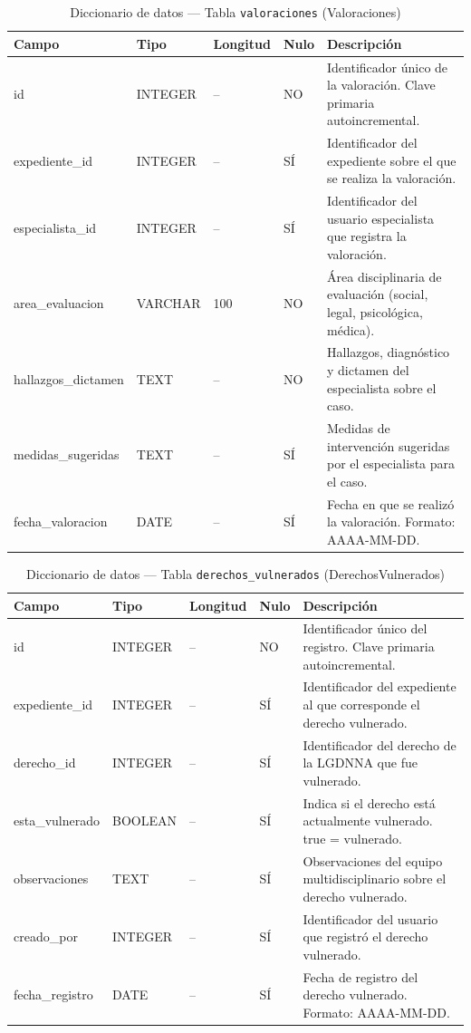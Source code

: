 \begin{table}[H]
	\centering
	\caption{Diccionario de datos --- Tabla \texttt{valoraciones} (Valoraciones)}
	\label{tab:data-dict-valoraciones}
	\scriptsize
	\begin{tabular}{>{\ttfamily\raggedright\arraybackslash}p{3.6cm} p{1.6cm} p{1.3cm} p{0.7cm} p{5.6cm}}
		\toprule
		\textbf{Campo} & \textbf{Tipo} & \textbf{Longitud} & \textbf{Nulo} & \textbf{Descripción} \\
		\midrule
		id & INTEGER & -- & NO & Identificador único de la valoración. Clave primaria autoincremental. \\
		expediente\_id & INTEGER & -- & SÍ & Identificador del expediente sobre el que se realiza la valoración. \\
		especialista\_id & INTEGER & -- & SÍ & Identificador del usuario especialista que registra la valoración. \\
		area\_evaluacion & VARCHAR & 100 & NO & Área disciplinaria de evaluación (social, legal, psicológica, médica). \\
		hallazgos\_dictamen & TEXT & -- & NO & Hallazgos, diagnóstico y dictamen del especialista sobre el caso. \\
		medidas\_sugeridas & TEXT & -- & SÍ & Medidas de intervención sugeridas por el especialista para el caso. \\
		fecha\_valoracion & DATE & -- & SÍ & Fecha en que se realizó la valoración. Formato: AAAA-MM-DD. \\
		\bottomrule
	\end{tabular}
\end{table}

\begin{table}[H]
	\centering
	\caption{Diccionario de datos --- Tabla \texttt{derechos\_vulnerados} (DerechosVulnerados)}
	\label{tab:data-dict-derechos_vulnerados}
	\scriptsize
	\begin{tabular}{>{\ttfamily\raggedright\arraybackslash}p{3.6cm} p{1.6cm} p{1.3cm} p{0.7cm} p{5.6cm}}
		\toprule
		\textbf{Campo} & \textbf{Tipo} & \textbf{Longitud} & \textbf{Nulo} & \textbf{Descripción} \\
		\midrule
		id & INTEGER & -- & NO & Identificador único del registro. Clave primaria autoincremental. \\
		expediente\_id & INTEGER & -- & SÍ & Identificador del expediente al que corresponde el derecho vulnerado. \\
		derecho\_id & INTEGER & -- & SÍ & Identificador del derecho de la LGDNNA que fue vulnerado. \\
		esta\_vulnerado & BOOLEAN & -- & SÍ & Indica si el derecho está actualmente vulnerado. true = vulnerado. \\
		observaciones & TEXT & -- & SÍ & Observaciones del equipo multidisciplinario sobre el derecho vulnerado. \\
		creado\_por & INTEGER & -- & SÍ & Identificador del usuario que registró el derecho vulnerado. \\
		fecha\_registro & DATE & -- & SÍ & Fecha de registro del derecho vulnerado. Formato: AAAA-MM-DD. \\
		\bottomrule
	\end{tabular}
\end{table}

